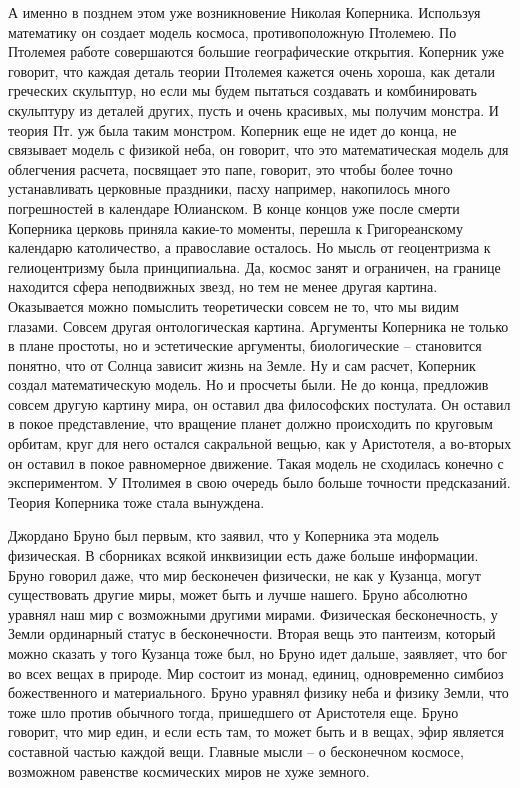 \documentclass[a4paper, 12pt]{article}
\begin{document}
А именно в позднем этом уже возникновение Николая Коперника. Используя 
математику он создает модель космоса, противоположную Птолемею. По 
Птолемея работе совершаются большие географические открытия. Коперник 
уже говорит, что каждая деталь теории Птолемея кажется очень хороша, как 
детали греческих скульптур, но если мы будем пытаться создавать 
и комбинировать скульптуру из деталей других, пусть и очень красивых, мы 
получим монстра. И теория Пт. уж была таким монстром. Коперник еще не 
идет до конца, не связывает модель с физикой неба, он говорит, что это 
математическая модель для облегчения расчета, посвящает это папе, 
говорит, это чтобы более точно устанавливать церковные праздники, пасху 
например, накопилось много погрешностей в календаре Юлианском. В конце 
концов уже после смерти Коперника церковь приняла какие-то моменты, 
перешла к Григореанскому календарю католичество, а православие осталось. 
Но мысль от геоцентризма к гелиоцентризму была принципиальна. Да, космос 
занят и ограничен, на границе находится сфера неподвижных звезд, но тем 
не менее другая картина. Оказывается можно помыслить теоретически совсем 
не то, что мы видим глазами. Совсем другая онтологическая картина. 
Аргументы Коперника не только в плане простоты, но и эстетические 
аргументы, биологические -- становится понятно, что от Солнца зависит 
жизнь на Земле. Ну и сам расчет, Коперник создал математическую модель. 
Но и просчеты были. Не до конца, предложив совсем другую картину мира, 
он оставил два философских постулата. Он оставил в покое представление, 
что вращение планет должно происходить по круговым орбитам, круг для 
него остался сакральной вещью, как у Аристотеля, а во-вторых он оставил 
в покое равномерное движение. Такая модель не сходилась конечно 
с экспериментом. У Птолимея в свою очередь было больше точности 
предсказаний. Теория Коперника тоже стала вынуждена.

Джордано Бруно был первым, кто заявил, что у Коперника эта модель 
физическая. В сборниках всякой инквизиции есть даже больше информации. 
Бруно говорил даже, что мир бесконечен физически, не как у Кузанца, 
могут существовать другие миры, может быть и лучше нашего. Бруно 
абсолютно уравнял наш мир с возможными другими мирами. Физическая 
бесконечность, у Земли ординарный статус в бесконечности. Вторая вещь 
это пантеизм, который можно сказать у того Кузанца тоже был, но Бруно 
идет дальше, заявляет, что бог во всех вещах в природе. Мир состоит из 
монад, единиц, одновременно симбиоз божественного и материального. Бруно 
уравнял физику неба и физику Земли, что тоже шло против обычного тогда, 
пришедшего от Аристотеля еще. Бруно говорит, что мир един, и если есть 
там, то может быть и в вещах, эфир является составной частью каждой 
вещи. Главные мысли -- о бесконечном космосе, возможном равенстве 
космических миров не хуже земного.
\end{document}
